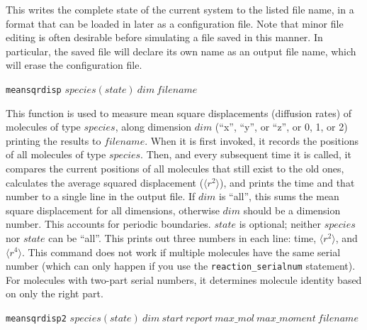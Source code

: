 \documentclass {book}
\newcommand {\ttt} {\texttt}
\begin{document}
\begin{description}
This writes the complete state of the current system to the listed file name, in a format that can be loaded in later as a configuration file. Note that minor file editing is often desirable before simulating a file saved in this manner. In particular, the saved file will declare its own name as an output file name, which will erase the configuration file.

\item{\ttt{meansqrdisp} $species(state)\ dim\ filename$}

This function is used to measure mean square displacements (diffusion rates) of molecules of type $species$, along dimension $dim$ (``x'', ``y'', or ``z'', or 0, 1, or 2) printing the results to $filename$. When it is first invoked, it records the positions of all molecules of type $species$. Then, and every subsequent time it is called, it compares the current positions of all molecules that still exist to the old ones, calculates the average squared displacement ($\langle r^2 \rangle$), and prints the time and that number to a single line in the output file. If $dim$ is ``all'', this sums the mean square displacement for all dimensions, otherwise $dim$ should be a dimension number. This accounts for periodic boundaries. $state$ is optional; neither $species$ nor $state$ can be ``all''. This prints out three numbers in each line: time, $\langle r^2 \rangle$, and $\langle r^4 \rangle$. This command does not work if multiple molecules have the same serial number (which can only happen if you use the \ttt{reaction\_serialnum} statement). For molecules with two-part serial numbers, it determines molecule identity based on only the right part.

\item{\ttt{meansqrdisp2} $species(state)\ dim\ start\ report\ max\_mol\ max\_moment\ filename$}


\end{description}
\end{document}
